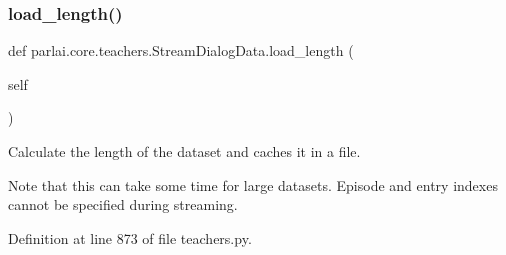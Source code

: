 \subsubsection{\texorpdfstring{load\+\_\+length()}{load\_length()}}
{\footnotesize\ttfamily def parlai.\+core.\+teachers.\+Stream\+Dialog\+Data.\+load\+\_\+length (\begin{DoxyParamCaption}\item[{}]{self }\end{DoxyParamCaption})}

\begin{DoxyVerb}Calculate the length of the dataset and caches it in a file.

Note that this can take some time for large datasets. Episode and entry indexes
cannot be specified during streaming.
\end{DoxyVerb}
 

Definition at line 873 of file teachers.\+py.


